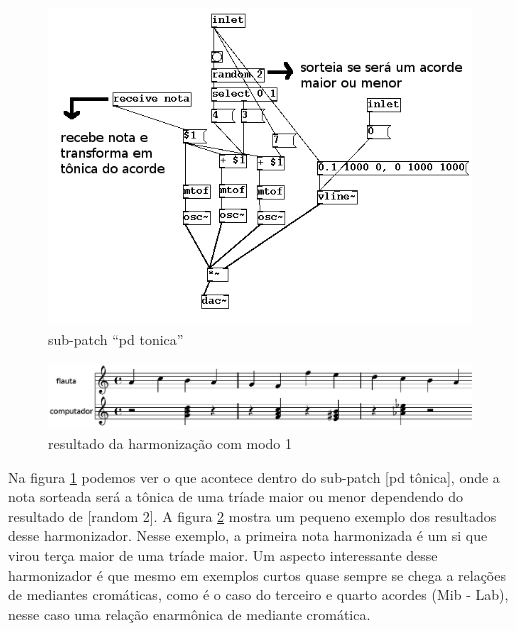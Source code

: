 \documentclass{ppgmus}
\begin{document}
\begin{figure}
\includegraphics[scale=.6]{harm2}
\caption{sub-patch ``pd tonica''}
\label{harm2}
\end{figure}

\begin{figure}
\includegraphics[scale=.4]{harm3}
\caption{resultado da harmonização com modo 1}
\label{harm3}
\end{figure}


Na figura \ref{harm2} podemos ver o que acontece dentro do sub-patch [pd tônica], onde a nota sorteada 
será a tônica de uma tríade maior ou menor dependendo do resultado de [random 2]. A figura \ref{harm3} 
mostra um pequeno exemplo dos resultados desse harmonizador. Nesse exemplo, a primeira nota 
harmonizada é um si que virou terça maior de uma tríade maior. Um aspecto interessante desse 
harmonizador é que mesmo em exemplos curtos quase sempre se chega a relações de mediantes 
cromáticas, como é o caso do terceiro e quarto acordes (Mib - Lab), nesse caso uma relação 
enarmônica de mediante cromática.
\end{document}
